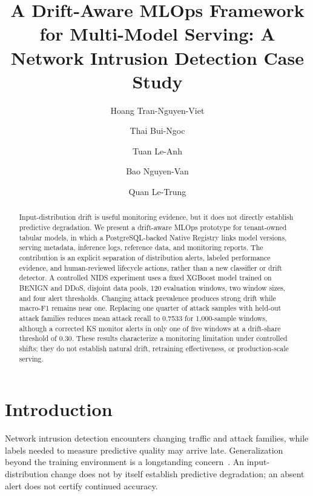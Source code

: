 \documentclass[runningheads]{llncs}
\begin{document}
\title{A Drift-Aware MLOps Framework for Multi-Model Serving: A Network Intrusion Detection Case Study}


\author{Hoang Tran-Nguyen-Viet \and
Thai Bui-Ngoc \and
Tuan Le-Anh \and
Bao Nguyen-Van \and
Quan Le-Trung
}



\maketitle

\begin{abstract}
Input-distribution drift is useful monitoring evidence, but it does not directly establish predictive degradation. We present a drift-aware MLOps prototype for tenant-owned tabular models, in which a PostgreSQL-backed Native Registry links model versions, serving metadata, inference logs, reference data, and monitoring reports. The contribution is an explicit separation of distribution alerts, labeled performance evidence, and human-reviewed lifecycle actions, rather than a new classifier or drift detector. A controlled NIDS experiment uses a fixed XGBoost model trained on BENIGN and DDoS, disjoint data pools, 120 evaluation windows, two window sizes, and four alert thresholds. Changing attack prevalence produces strong drift while macro-F1 remains near one. Replacing one quarter of attack samples with held-out attack families reduces mean attack recall to 0.7533 for 1,000-sample windows, although a corrected KS monitor alerts in only one of five windows at a drift-share threshold of 0.30. These results characterize a monitoring limitation under controlled shifts; they do not establish natural drift, retraining effectiveness, or production-scale serving.
\end{abstract}

\section{Introduction}
Network intrusion detection encounters changing traffic and attack families, while labels needed to measure predictive quality may arrive late. Generalization beyond the training environment is a longstanding concern~\cite{sommer2010closedworld}. An input-distribution change does not by itself establish predictive degradation; an absent alert does not certify continued accuracy.
\end{document}
